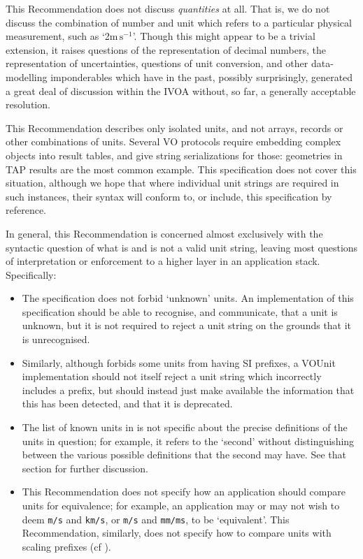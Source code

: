 \documentclass[11pt,a4paper]{ivoa}
\newcommand{\unit}[1]{\texttt{\small\color{orange}#1}}
\begin{document}
This Recommendation does not discuss \emph{quantities} at all.  That
is, we do not discuss the combination of number and unit which refers
to a particular physical measurement, such as `2$\mathrm m\,\mathrm
s^{-1}$'.  Though this might appear to be a trivial extension, it
raises questions of the representation of decimal numbers, the
representation of uncertainties, questions of unit conversion, and
other data-modelling imponderables which have in the past, possibly
surprisingly, generated a great deal of discussion within the
IVOA without, so far, a generally acceptable resolution.

This Recommendation describes only isolated units, and not arrays,
records or other combinations of units.  Several VO protocols require
embedding complex objects into result tables, and give string
serializations for those: geometries in TAP results are the most
common example.  This specification does not cover this situation,
although we hope that where individual unit strings are required in
such instances, their syntax will conform to, or include, this
specification by reference.

In general, this Recommendation is concerned almost exclusively with
the syntactic question of what is and is not a valid unit string,
leaving most questions of interpretation or enforcement to a higher layer in an
application stack.  Specifically:
\begin{itemize}
\item The specification does not forbid `unknown' units.  An
implementation of this specification should be able to recognise, and
communicate, that a unit is unknown, but it is not required to reject
a unit string on the grounds that it is unrecognised.

\item Similarly, although  forbids some
units from having SI prefixes, a VOUnit implementation should not
itself reject a unit string which incorrectly includes a prefix, but
should instead just make available the information that this has been
detected, and that it is deprecated.

\item The list of known units in  is not
specific about the precise definitions of the units in question; for
example, it refers to the `second' without distinguishing between the
various possible definitions that the second may have.
See that section for further discussion.

\item This Recommendation does not specify how an application should
compare units for equivalence; for example, an application may or may
not wish to deem \unit{m/s} and \unit{km/s}, or \unit{m/s} and
\unit{mm/ms}, to be `equivalent'.
This Recommendation, similarly, does not specify how to compare units
with scaling prefixes (cf ).
\end{itemize}
\end{document}
